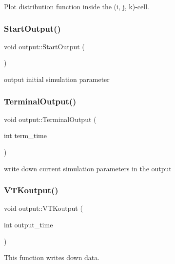 Plot distribution function inside the (i, j, k)-\/cell. 

\mbox{\label{classoutput_a966b89dee3e30057e3dd35e217207256}} 
\subsubsection{\texorpdfstring{Start\+Output()}{StartOutput()}}
{\footnotesize\ttfamily void output\+::\+Start\+Output (\begin{DoxyParamCaption}{ }\end{DoxyParamCaption})}



output initial simulation parameter 

\mbox{\label{classoutput_a2faa52f88e4391dc693e46324f071b0a}} 
\subsubsection{\texorpdfstring{Terminal\+Output()}{TerminalOutput()}}
{\footnotesize\ttfamily void output\+::\+Terminal\+Output (\begin{DoxyParamCaption}\item[{int}]{term\+\_\+time }\end{DoxyParamCaption})}



write down current simulation parameters in the output 

\mbox{\label{classoutput_ab34128a74d16450b92b1f42e89141aa7}} 
\subsubsection{\texorpdfstring{V\+T\+Koutput()}{VTKoutput()}}
{\footnotesize\ttfamily void output\+::\+V\+T\+Koutput (\begin{DoxyParamCaption}\item[{int}]{output\+\_\+time }\end{DoxyParamCaption})}



This function writes down data. 

